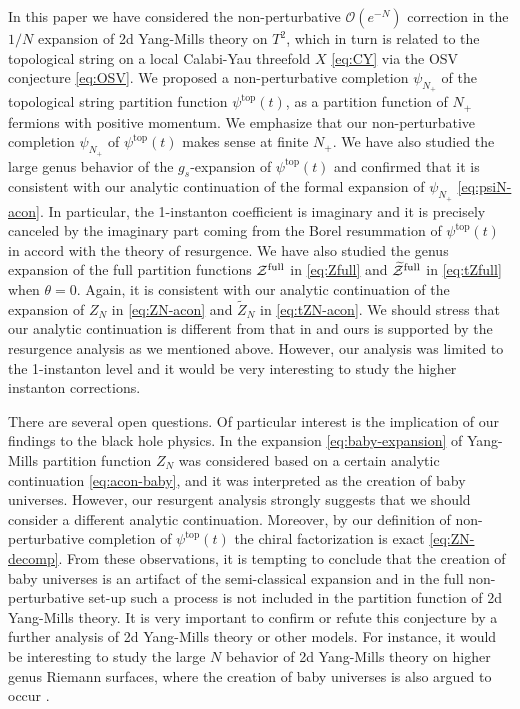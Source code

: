 \documentclass[11pt]{article}
\def\th{\theta}
\renewcommand{\[}{\begin{eqnarray}}
\renewcommand{\]}{\end{eqnarray}}
\newcommand{\Zefull}{{\cal Z}^{\text{full}}}
\newcommand{\Zofull}{{\widetilde{\cal Z}}^{\text{full}}}
\begin{document}
In this paper we have considered the non-perturbative $\mathcal{O}(e^{-N})$
correction in the $1/N$
expansion of 2d Yang-Mills theory on $T^2$,
which in turn is related to the topological string on a local Calabi-Yau
threefold $X$ \eqref{eq:CY} via the OSV conjecture \eqref{eq:OSV}.
We proposed a non-perturbative completion $\psi_{N_+}$
of the topological string partition function $\psi^{\text{top}}(t)$, 
 as a partition function
of $N_+$ fermions with positive momentum.
We emphasize that our non-perturbative completion $\psi_{N_+}$ of
$\psi^{\text{top}}(t)$ makes sense
at finite $N_+$.
We have also studied the large genus behavior of the $g_s$-expansion
of $\psi^{\text{top}}(t)$ and confirmed that it is consistent with our analytic continuation
of the formal expansion of $\psi_{N_+}$ \eqref{eq:psiN-acon}.
In particular, the 1-instanton coefficient is imaginary and it is 
precisely canceled by the imaginary part coming from the Borel resummation of $\psi^{\text{top}}(t)$
in accord with the theory of resurgence.
We have also studied the genus expansion of
the full partition functions $\Zefull$ in \eqref{eq:Zfull} 
and $\Zofull$
in \eqref{eq:tZfull} 
when $\th=0$. Again, it is consistent 
with our analytic continuation of 
the expansion of $Z_{N}$  in \eqref{eq:ZN-acon}
and $\tilde{Z}_N$ in \eqref{eq:tZN-acon}.
We should stress that our analytic continuation is different from that
in \cite{Dijkgraaf:2005bp} and ours is supported by the resurgence analysis as we mentioned above.
However, our analysis was limited to the 1-instanton
level and it would be very interesting to study the 
higher instanton corrections.


There are several open questions.
Of particular interest is the implication of our findings to the black hole physics.
In \cite{Dijkgraaf:2005bp} the expansion \eqref{eq:baby-expansion} of Yang-Mills partition function
$Z_N$ was considered based on a certain analytic continuation \eqref{eq:acon-baby},
and it was interpreted as the creation of baby universes.
However, our resurgent analysis strongly suggests that we should consider a different analytic continuation.
Moreover, by our definition of non-perturbative completion of $\psi^{\text{top}}(t)$
the chiral factorization is exact \eqref{eq:ZN-decomp}.
From these observations,
it is tempting to conclude that the creation of baby universes
is an artifact of the semi-classical expansion and in the full non-perturbative set-up
such a process is not included in the partition function of 
2d Yang-Mills theory. It is very important to confirm or refute
this conjecture by a further analysis of 2d Yang-Mills theory or other models.
For instance, it would be interesting to study the large $N$ behavior
of 2d Yang-Mills theory on higher genus Riemann
surfaces, where the creation of baby universes is also argued to occur \cite{Aganagic:2006je}. 
\end{document}
